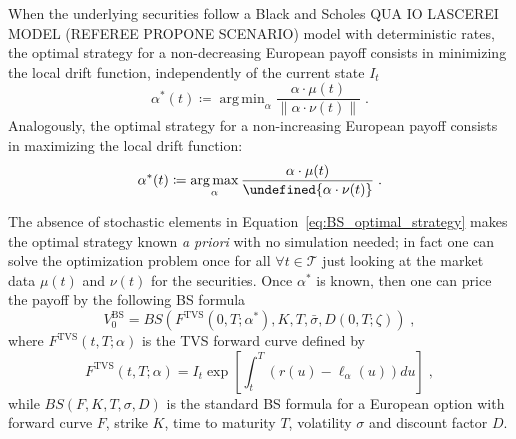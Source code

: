 \documentclass[runningheads]{m2ef}
\DeclareMathOperator*{\argmax}{arg\,max}
\DeclareMathOperator*{\argmin}{arg\,min}
\let\norm\undefined %
\DeclarePairedDelimiter\norm{\lVert}{\rVert}
\newcommand{\change}[1]{{\color{red} {#1}}}%
\begin{document}
\begin{proposition}
When the underlying securities follow a Black and Scholes \change{QUA IO LASCEREI MODEL (REFEREE PROPONE SCENARIO)} model with deterministic rates, the optimal strategy for a non-decreasing European payoff consists in minimizing the local drift function, independently of the current state $I_t$
\begin{equation}
    \alpha^*(t) \coloneqq \argmin_\alpha \frac{\alpha \cdot \mu(t)}{\|\alpha \cdot \nu(t) \|} \; .
\label{eq:BS_optimal_strategy}
\end{equation}
Analogously, the optimal strategy for a non-increasing European payoff consists in maximizing the local drift function:
\begin{equation}
    \alpha^*(t) \coloneqq \argmax_\alpha \frac{\alpha \cdot \mu(t)}{\norm{\alpha \cdot \nu(t)}} \; .
\label{eq:BS_optimal_strategy_put}
\end{equation}
\end{proposition}
The absence of stochastic elements in Equation~\eqref{eq:BS_optimal_strategy} makes the optimal strategy known \textit{a priori} with no simulation needed; in fact one can solve the optimization problem once for all $\forall t \in \mathcal{T}$ just looking at the market data $\mu(t)$ and $\nu(t)$ for the securities. Once $\alpha^*$ is known, then one can price the payoff by the following BS formula
\begin{equation}
	V_0^{\text{BS}} = BS(F^{\text{TVS}}(0,T;\alpha^*), K, T, \bar{\sigma}, D(0,T;\zeta)) \; ,
\label{eq:bs_closed_solution}\end{equation}
where $F^{\text{TVS}}(t,T;\alpha)$ is the TVS forward curve defined by
\begin{equation}
	F^{\text{TVS}}(t,T;\alpha) = I_t \exp\left[\int_t^T\left(r(u)-\ell_{\alpha} \left(u\right)\right)du\right] \; ,
\label{eq:tvs_forward}\end{equation}
while $BS(F,K,T,\sigma,D)$ is the standard BS formula for a European option with forward curve $F$, strike $K$, time to maturity $T$, volatility $\sigma$ and discount factor $D$. 
\end{document}

